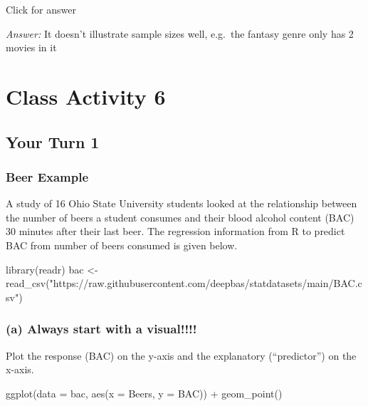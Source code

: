 \documentclass[
]{book}
\newenvironment{Shaded}{\begin{snugshade}}{\end{snugshade}}
\newcommand{\AttributeTok}[1]{\textcolor[rgb]{0.77,0.63,0.00}{#1}}
\newcommand{\FunctionTok}[1]{\textcolor[rgb]{0.00,0.00,0.00}{#1}}
\newcommand{\NormalTok}[1]{#1}
\newcommand{\OtherTok}[1]{\textcolor[rgb]{0.56,0.35,0.01}{#1}}
\newcommand{\SpecialCharTok}[1]{\textcolor[rgb]{0.00,0.00,0.00}{#1}}
\newcommand{\StringTok}[1]{\textcolor[rgb]{0.31,0.60,0.02}{#1}}
\begin{document}
Click for answer

\emph{Answer:} It doesn't illustrate sample sizes well, e.g.~the fantasy genre only has 2 movies in it

\hypertarget{class-activity-6}{%
\chapter{Class Activity 6}\label{class-activity-6}}

\hypertarget{your-turn-1-3}{%
\section{Your Turn 1}\label{your-turn-1-3}}

\hypertarget{beer-example}{%
\subsection{Beer Example}\label{beer-example}}

A study of 16 Ohio State University students looked at the relationship between the number of beers a student consumes and their blood alcohol content (BAC) 30 minutes after their last beer. The regression information from R to predict BAC from number of beers consumed is given below.

\begin{Shaded}
\begin{Highlighting}[]
\FunctionTok{library}\NormalTok{(readr)}
\NormalTok{bac }\OtherTok{\textless{}{-}} \FunctionTok{read\_csv}\NormalTok{(}\StringTok{"https://raw.githubusercontent.com/deepbas/statdatasets/main/BAC.csv"}\NormalTok{)}
\end{Highlighting}
\end{Shaded}

\hypertarget{a-always-start-with-a-visual}{%
\subsection{(a) Always start with a visual!!!!}\label{a-always-start-with-a-visual}}

Plot the response (BAC) on the y-axis and the explanatory (``predictor'') on the x-axis.

\begin{Shaded}
\begin{Highlighting}[]
\FunctionTok{ggplot}\NormalTok{(}\AttributeTok{data =}\NormalTok{ bac, }\FunctionTok{aes}\NormalTok{(}\AttributeTok{x =}\NormalTok{ Beers, }\AttributeTok{y =}\NormalTok{ BAC)) }\SpecialCharTok{+} \FunctionTok{geom\_point}\NormalTok{()}
\end{Highlighting}
\end{Shaded}
\end{document}
